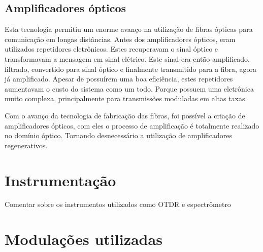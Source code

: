 \documentclass[article]{IEEEtran}
\begin{document}
\subsection{Amplificadores ópticos}
\par Esta tecnologia permitiu um enorme avanço na utilização de fibras ópticas para comunicação em longas distâncias. Antes dos amplificadores ópticos, eram utilizados repetidores eletrônicos. Estes recuperavam o sinal óptico e transformavam a mensagem em sinal elétrico. Este sinal era então amplificado, filtrado, convertido para sinal óptico e finalmente transmitido para a fibra, agora já amplificado. Apesar de possuírem uma boa eficiência, estes repetidores aumentavam o custo do sistema como um todo. Porque possuem uma eletrônica muito complexa, principalmente para transmissões moduladas em altas taxas.
\par Com o avanço da tecnologia de fabricação das fibras, foi possível a criação de amplificadores ópticos, com eles o processo de amplificação é totalmente realizado no domínio óptico. Tornando desnecessário a utilização de amplificadores regenerativos.

\section{Instrumentação}
Comentar sobre os instrumentos utilizados como OTDR e espectrômetro

\section{Modulações utilizadas}
\end{document}
